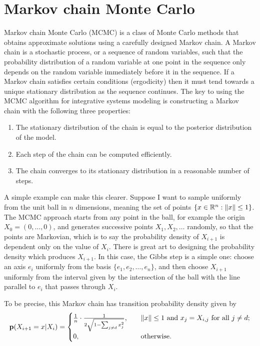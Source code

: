 \section{Markov chain Monte Carlo}
Markov chain Monte Carlo (MCMC) is a class of Monte Carlo methods that
obtains approximate solutions using a carefully designed Markov
chain. A Markov chain is a stochastic process, or a sequence of random
variables, such that the probability distribution of a random variable
at one point in the sequence only depends on the random variable
immediately before it in the sequence. If a Markov chain satisfies
certain conditions (ergodicity) then it must tend towards a unique stationary
distribution as the sequence continues. The key to using the MCMC
algorithm for integrative systems modeling is constructing a Markov
chain with the following three properties:
\begin{enumerate}
\item The stationary distribution of the chain is equal to the
  posterior distribution of the model.
\item Each step of the chain can be computed efficiently.
\item The chain converges to its stationary distribution in a
  reasonable number of steps.
\end{enumerate}

A simple example can make this clearer. Suppose I want to sample
uniformly from the unit ball in $n$ dimensions, meaning the set of
points $\{x \in \mathbb{R}^n: \|x\| \leq 1\}$.  The MCMC approach starts
from any point in the ball, for example the origin $X_0 = (0, \ldots,
0)$, and generates successive points $X_1, X_2, \ldots$ randomly, so
that the points are Markovian, which is to say the probability density
of $X_{i+1}$ is dependent only on the value of $X_i$.  There is great
art to designing the probability density which produces $X_{i+1}$.  In
this case, the Gibbs step is a simple one: choose an axis $e_i$
uniformly from the basis $\{e_1, e_2, \ldots, e_n\}$, and then choose
$X_{i+1}$ uniformly from the interval given by the
intersection of the ball with the line parallel to $e_i$ that passes through $X_i$.

To be precise, this Markov chain has transition probability density given by
\[
\mathbf{p}(X_{i+1}=x|X_i) =
\begin{cases}
\frac{1}{n}\cdot\frac{1}{2\sqrt{1-\sum_{j \neq d} x_j^2}}, &\quad\|x\| \leq 1 \text{ and } x_j = X_{i,j} \text{ for all }j \neq d;\\
0, &\quad\text{otherwise.}
\end{cases}
\]

